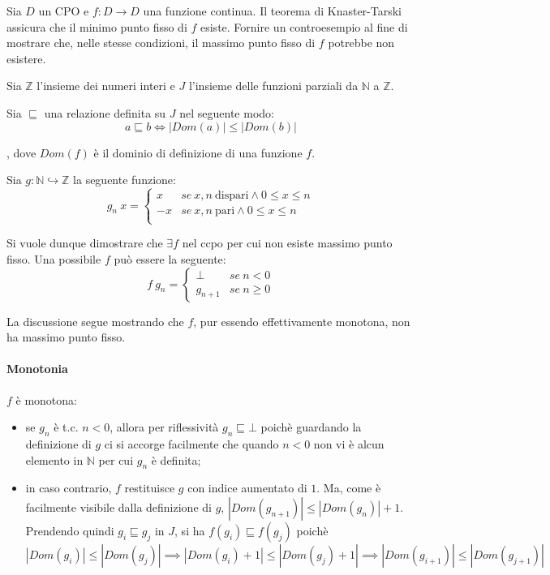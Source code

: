 \newcommand{\lt}{\ensuremath{\sqsubseteq}}

{
  Sia $D$ un CPO e $f: D \to D$ una funzione continua. Il teorema di
  Knaster-Tarski assicura che il minimo punto fisso di $f$ esiste.
  Fornire un controesempio al fine di mostrare che, nelle stesse condizioni, il
  massimo punto fisso di $f$ potrebbe non esistere.
}
{
}

Sia $\mathbb{Z}$ l'insieme dei numeri interi e $J$ l'insieme delle funzioni
parziali da $\mathbb{N}$ a $\mathbb{Z}$.

Sia \lt{} una relazione definita su $J$ nel seguente modo:
$$
a \lt b \iff |Dom(a)| \leq |Dom(b)|
$$

, dove $Dom(f)$ è il dominio di definizione di una funzione $f$.

Sia $g: \mathbb{N} \hookrightarrow{} \mathbb{Z}$ la seguente funzione:
$$
g_n\ x =
\begin{cases}
      x & se\ x,n\ \text{dispari} \land 0 \leq x \leq n \\
     -x & se\ x,n\ \text{pari}    \land 0 \leq x \leq n \\
   \end{cases}
$$

Si vuole dunque dimostrare che $\exists{f}$ nel ccpo \setRel{J}{\lt} per cui
non esiste massimo punto fisso. Una possibile $f$ può essere la seguente:
$$
f\ g_n =
\begin{cases}
      \bot    & se\ n < 0 \\
      g_{n+1} & se\ n \geq 0
   \end{cases}
$$

La discussione segue mostrando che $f$, pur essendo effettivamente monotona,
non ha massimo punto fisso.

\paragraph{Monotonia} $f$ è monotona:
\begin{itemize}
  \item se $g_n$ è t.c. $n < 0$, allora per riflessività $g_n \lt \bot$ poichè
    guardando la definizione di $g$ ci si accorge facilmente che quando $n < 0$
    non vi è alcun elemento in $\mathbb{N}$ per cui $g_n$ è definita;
  \item in caso contrario, $f$ restituisce $g$ con indice aumentato di $1$. Ma,
    come è facilmente visibile dalla definizione di $g$,
    $|Dom(g_{n+1})| \leq |Dom(g_n)| + 1$. Prendendo quindi $g_i \lt g_j$ in
    $J$, si ha
    $f(g_i) \lt f(g_j)$ poichè
    $$
    |Dom(g_i)| \leq |Dom(g_j)|
    \implies
    |Dom(g_i) + 1| \leq |Dom(g_j) + 1|
    \implies
    |Dom(g_{i+1})| \leq |Dom(g_{j+1})|
    $$
\end{itemize}

